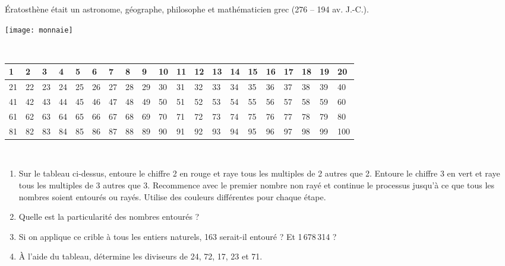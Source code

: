 \newpage

\begin{activite}

 \begin{minipage}[c]{0.6\textwidth}
Ératosthène était un astronome, géographe, philosophe et mathématicien grec (276 – 194 av. J.-C.).
 \end{minipage} \hfill%
 \begin{minipage}[c]{0.2\textwidth}
  \texttt{[image: monnaie]}
  \end{minipage} \\[1em]
  
\begin{tabularx}{1.01\linewidth}{|X|X|X|X|X|X|X|X|X|X|X|X|X|X|X|X|X|X|X|X|}
     \hline
     1 & 2 & 3 & 4 & 5 & 6 & 7 & 8 & 9 & 10 & 11 & 12 & 13 & 14 & 15 & 16 & 17 & 18 & 19 & 20 \\ \hline
     21 & 22 & 23 & 24 & 25 & 26 & 27 & 28 & 29 & 30 & 31 & 32 & 33 & 34 & 35 & 36 & 37 & 38 & 39 & 40 \\ \hline
     41 & 42 & 43 & 44 & 45 & 46 & 47 & 48 & 49 & 50 & 51 & 52 & 53 & 54 & 55 & 56 & 57 & 58 & 59 & 60 \\ \hline
     61 & 62 & 63 & 64 & 65 & 66 & 67 & 68 & 69 & 70 & 71 & 72 & 73 & 74 & 75 & 76 & 77 & 78 & 79 & 80 \\ \hline
     81 & 82 & 83 & 84 & 85 & 86 & 87 & 88 & 89 & 90 & 91 & 92 & 93 & 94 & 95 & 96 & 97 & 98 & 99 & \small{100} \\ \hline
  \end{tabularx} \\
  
\begin{enumerate}             
 \item Sur le tableau ci-dessus, entoure le chiffre 2 en rouge et raye tous les multiples de 2 autres que 2. Entoure le chiffre 3 en vert et raye tous les multiples de 3 autres que 3. Recommence avec le premier nombre non rayé et continue le processus jusqu'à ce que tous les nombres soient entourés ou rayés. Utilise des couleurs différentes pour chaque étape.
 \item Quelle est la particularité des nombres entourés ?
 \item Si on applique ce crible à tous les entiers naturels, 163 serait-il entouré ? Et 1\,678\,314 ?
 \item À l'aide du tableau, détermine les diviseurs de 24, 72, 17, 23 et 71.
 \end{enumerate}

\end{activite}

